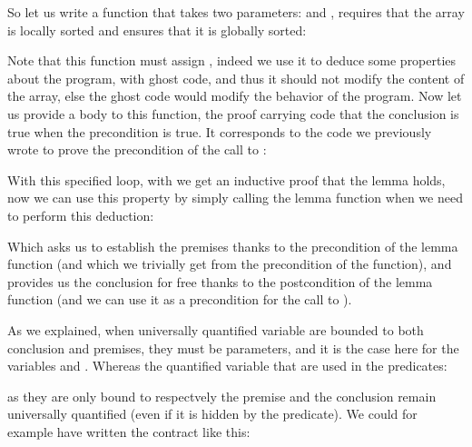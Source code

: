 So let us write a function that takes two parameters:  and
, requires that the array is locally sorted and ensures that it
is globally sorted:






Note that this function must assign , indeed
we use it to deduce some properties about the program, with ghost code, and
thus it should not modify the content of the array, else the ghost code would
modify the behavior of the program. Now let us provide a body to this function,
the proof carrying code that the conclusion is true when the precondition is true.
It corresponds to the code we previously wrote to prove the precondition of
the call to :






With this specified loop, with we get an inductive proof that the lemma holds,
now we can use this property by simply calling the lemma function when we need
to perform this deduction:






Which asks us to establish the premises thanks to the precondition of the lemma
function (and which we trivially get from the precondition of the
 function), and provides us the conclusion for free
thanks to the postcondition of the lemma function (and we can use it as a
precondition for the call to ).



As we explained, when universally quantified variable are bounded to both
conclusion and premises, they must be parameters, and it is the case here for
the variables  and . Whereas the quantified
variable that are used in the predicates:






as they are only bound to respectvely the premise and the conclusion remain
universally quantified (even if it is hidden by the predicate). We could for
example have written the contract like this:



